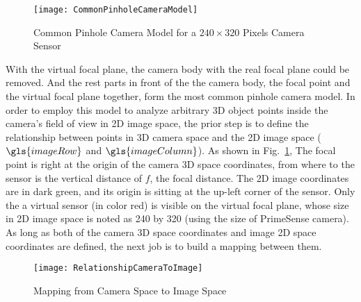 \begin{figure}[t]
\centering
\texttt{[image: CommonPinholeCameraModel]}
\caption{Common Pinhole Camera Model for a $240\times320$ Pixels Camera Sensor}
\label{CommonPinholeCameraModel}
\end{figure}%
%

With the virtual focal plane, the camera body with the real focal plane could be removed. And the rest parts in front of the the camera body, the focal point and the virtual focal plane together, form the most common pinhole camera model. In order to employ this model to analyze arbitrary \gls{3D} object points inside the camera's field of view in 2D image space, the prior step is to define the relationship between points in \gls{3D} camera space and the 2D image space (\(\gls{imageRow}\) and \(\gls{imageColumn}\)). As shown in Fig.~\ref{CommonPinholeCameraModel}, The focal point is right at the origin of the camera \gls{3D} space coordinates, from where to the sensor is the vertical distance of \(f\), the focal distance. The 2D image coordinates are in dark green, and its origin is sitting at the up-left corner of the sensor. Only the a virtual sensor (in color red) is visible on the virtual focal plane, whose size in 2D image space is noted as 240 by 320 (using the size of PrimeSense camera). As long as both of the camera \gls{3D} space coordinates and image 2D space coordinates are defined, the next job is to build a mapping between them.
%
\begin{figure}[t]
\centering
\texttt{[image: RelationshipCameraToImage]}
\caption{Mapping from Camera Space to Image Space}
\label{RelationshipCameraToImage}
\end{figure}%
%

